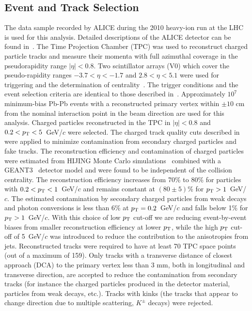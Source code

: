 \documentclass[ALICE,manyauthors]{cernphprep}
\begin{document}
\subsection{Event and Track Selection}
\label{sec:experiment}
The data sample recorded by ALICE during the 2010 heavy-ion run at the
LHC is used for this analysis. Detailed descriptions of the ALICE
detector can be found
in~\cite{Aamodt:2008zz,Carminati:2004fp,Alessandro:2006yt}. The Time
Projection Chamber (TPC) was used to reconstruct charged particle
tracks and measure their momenta with full azimuthal coverage in the
pseudorapidity range $|\eta|<0.8$. Two scintillator
arrays (V0) which cover the pseudo-rapidity ranges $-3.7<\eta<-1.7$
and $2.8<\eta<5.1$ were used for triggering and the determination of
centrality~\cite{Aamodt:2010cz}. The trigger
conditions and the event selection criteria are identical to those
described in~\cite{Aamodt:2010pa, Aamodt:2010cz}.
Approximately $10^7$ minimum-bias Pb-Pb events with
a reconstructed primary vertex within $\pm 10$ cm from the nominal
interaction point in the beam direction are used for this
analysis. Charged particles reconstructed in the TPC in $|\eta|<0.8$
and $0.2<p_{\textnormal{T}}<5$~GeV/$c$ were selected. The charged track quality cuts
described in~\cite{Aamodt:2010pa} were applied to minimize
contamination from secondary charged particles and fake tracks.
The reconstruction efficiency and contamination of charged particles
were estimated from {\sc HIJING} Monte Carlo
simulations~\cite{Wang:1991hta} combined with a {\sc
GEANT3}~\cite{Brun:1994aa} detector model and were found to be independent of
the collision centrality. The reconstruction efficiency increases from
70\% to 80\% for particles with $0.2<p_{\textnormal{T}}<1$~GeV/$c$ and remains
constant at $(80 \pm 5)$\% for $p_{\textnormal{T}}>1$~GeV/$c$. The estimated
contamination by secondary charged particles from weak decays and
photon conversions is less than 6\% at $p_{\textnormal{T}}=0.2$~GeV/$c$ and falls
below 1\% for $p_{\textnormal{T}}>1$~GeV/$c$.
With this choice of low $p_{\textnormal{T}}{}$ cut-off we are reducing event-by-event biases from smaller reconstruction efficiency 
at lower $p_{\textnormal{T}}{}$, while the high $p_{\textnormal{T}}{}$ cut-off of 5~GeV/$c$ was introduced to reduce the contribution to the anisotropies from jets. 
Reconstructed tracks were required to have at least 70 TPC space points (out of a maximum of 159). 
Only tracks with a transverse distance of closest approach (DCA) to the primary vertex less than 3 mm, both in longitudinal and transverse direction, are accepted to reduce the contamination from secondary tracks (for instance the charged particles produced 
in the detector material, particles from weak decays, etc.). 
Tracks with kinks (the tracks that appear to change direction due to multiple scattering, $K^{\pm}$ decays) were rejected.
\end{document}
